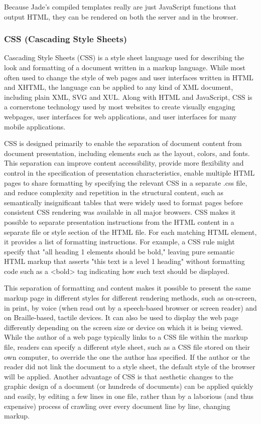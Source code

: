 Because Jade's compiled templates really are just JavaScript functions that output
HTML, they can be rendered on both the server and in the browser.
\subsubsection{CSS (Cascading Style Sheets)}
Cascading Style Sheets (CSS) is a style sheet language used for describing the look and formatting of a document written in a markup language. While most often used to change the style of web pages and user interfaces written in HTML and XHTML, the language can be applied to any kind of XML document, including plain XML, SVG and XUL. Along with HTML and JavaScript, CSS is a cornerstone technology used by most websites to create visually engaging webpages, user interfaces for web applications, and user interfaces for many mobile applications.


CSS is designed primarily to enable the separation of document content from document presentation, including elements such as the layout, colors, and fonts. This separation can improve content accessibility, provide more flexibility and control in the specification of presentation characteristics, enable multiple HTML pages to share formatting by specifying the relevant CSS in a separate .css file, and reduce complexity and repetition in the structural content, such as semantically insignificant tables that were widely used to format pages before consistent CSS rendering was available in all major browsers. CSS makes it possible to separate presentation instructions from the HTML content in a separate file or style section of the HTML file. For each matching HTML element, it provides a list of formatting instructions. For example, a CSS rule might specify that "all heading 1 elements should be bold," leaving pure semantic HTML markup that asserts "this text is a level 1 heading" without formatting code such as a <bold> tag indicating how such text should be displayed.


This separation of formatting and content makes it possible to present the same markup page in different styles for different rendering methods, such as on-screen, in print, by voice (when read out by a speech-based browser or screen reader) and on Braille-based, tactile devices. It can also be used to display the web page differently depending on the screen size or device on which it is being viewed. While the author of a web page typically links to a CSS file within the markup file, readers can specify a different style sheet, such as a CSS file stored on their own computer, to override the one the author has specified. If the author or the reader did not link the document to a style sheet, the default style of the browser will be applied. Another advantage of CSS is that aesthetic changes to the graphic design of a document (or hundreds of documents) can be applied quickly and easily, by editing a few lines in one file, rather than by a laborious (and thus expensive) process of crawling over every document line by line, changing markup.


